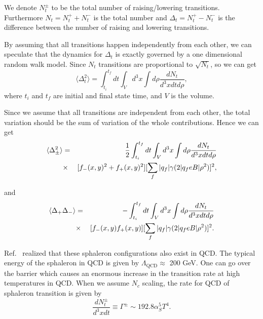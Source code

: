 \documentclass[twocolumn,showpacs,preprintnumbers,amsmath,amssymb]{revtex4}
\begin{document}
We denote $N_{t}^{\pm}$ to be the total number of raising/lowering transitions. Furthermore $N_{t} = N^{+}_{t}+N^{-}_{t}$ is the total number and $\Delta_{t}=N^{+}_{t}-N^{-}_{t}$ is the
difference between the number of raising and lowering transitions.

By assuming that all transitions happen independently from each other, we can speculate that the dynamics for $\Delta_{t}$ is exactly governed by a one dimensional random walk
model. Since $N_{t}$ transitions are proportional to $\sqrt{N_{t}}$, so we can get
\begin{equation}%
\langle \Delta_{t}^{2} \rangle=\int_{t_{i}}^{t_{f}}dt\int_{V}d^{3}x\int d\rho\frac{dN_{t}}{d^{3}xdtd\rho},
\label{eq:eq6} %
\end{equation}
\noindent where $t_{i}$ and $t_{f}$ are initial and final state time, and $V$ is the volume.

Since we assume that all transitions are independent
from each other, the total variation should be the sum of variation of the whole contributions. Hence we can get
\begin{eqnarray}
\langle \Delta_{\pm}^{2} \rangle&=&\frac{1}{2}\int_{t_{i}}^{t_{f}}dt\int_{V}d^{3}x\int d\rho\frac{dN_{t}}{d^{3}xdtd\rho}\\
&\times&[f_{-}(x,y)^{2}+f_{+}(x,y)^{2}]\large[\sum_{f}|q_{f}|\gamma(2|q_{f}eB|\rho^{2})\large]^{2}\nonumber,
\label{eq:eq7} %
\end{eqnarray}

\noindent and
\begin{eqnarray}
\langle \Delta_{+}\Delta_{-} \rangle&=&-\int_{t_{i}}^{t_{f}}dt\int_{V}d^{3}x\int d\rho\frac{dN_{t}}{d^{3}xdtd\rho}\\
&\times&[f_{-}(x,y)f_{+}(x,y)]\large[\sum_{f}|q_{f}|\gamma(2|q_{f}eB|\rho^{2})\large]^{2}\nonumber.
\label{eq:eq8} %
\end{eqnarray}

Ref.~\cite{lab23} realized that these sphaleron configurations also exist in QCD. The typical energy of the
sphaleron in QCD is given by $\Lambda_{\textrm{QCD}}\approx$ 200 GeV. One can go over the barrier which causes an
enormous increase in the transition rate at high temperatures in QCD. When we assume $N_{c}$ scaling, the rate for QCD
of sphaleron transition is given by~\cite{lab23,lab24,lab25}
\begin{equation}%
\frac{dN_{t}^{\pm}}{d^{3}xdt}\equiv\Gamma^{\pm}\sim192.8\alpha_{S}^{5}T^{4}.
\label{eq:eq9} %
\end{equation}
\end{document}
